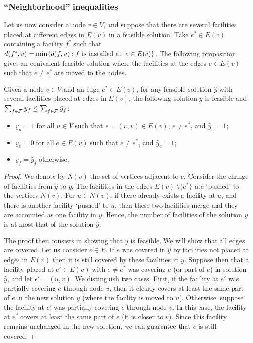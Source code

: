 \subsubsection*{``Neighborhood'' inequalities}
Let us now consider a node $v\in V$, and suppose that there are several facilities placed at different edges in $E(v)$ in a feasible solution. Take $e^*\in E(v)$ containing a facility $f^*$ such that $d(f^*,v)=\min \{d(f,v): f \textup{ is installed at }\:e\in E(v)\}$. The following proposition gives an equivalent feasible solution where the facilities at the edges $e\in E(v)$ such that $e\neq e^*$ are moved to the nodes.
\begin{proposition}\label{lemma:ineq}
Given a node $v \in V$ and an edge $e^* \in E(v)$, for any feasible solution $\hat{y}$ with several facilities placed at edges in $E(v)$, the following solution $y$ is feasible and $\sum_{f \in \mathcal F} y_f \le \sum_{f \in \mathcal F} \hat{y}_f$:
\begin{itemize}
	\item $y_{u}=1$ for all $u\in V$ such that $e=(u,v)\in E(v)$, $e \neq e^*$, and $\hat{y}_e=1$;
	\item $y_{e}=0$ for all $e\in E(v)$ such that $e \neq e^*$, and $\hat{y}_e=1$;
	\item $y_f=\hat{y}_f$ otherwise.
\end{itemize}
\end{proposition}
\begin{proof}
We denote by $N(v)$ the set of vertices adjacent to $v$. Consider the change of facilities from $\hat{y}$ to $y$. The facilities in the edges $E(v) \ \setminus \{e^*\}$ are `pushed' to the vertices $N(v)$. For $u \in N(v)$, if there already exists a facility at $u$, and there is another facility `pushed' to $u$, then these two facilities merge and they are accounted as one facility in  $y$. Hence, the number of facilities of the solution $y$ is at most that of the solution $\hat{y}$.

The proof then consists in showing that $y$ is feasible. We will show that all edges are covered. Let us consider $e\in E$. If $e$ was covered in $\hat{y}$ by facilities not placed at edges in $E(v)$ then it is still covered by these facilities in $y$. Suppose then that a facility placed at $e'\in E(v)$ with $e\neq e^*$ was covering $e$ (or part of $e$) in solution $\hat{y}$, and let $e'=(u,v)$. We distinguish two cases. First, if the facility at $e'$ was partially covering $e$ through node $u$, then it clearly covers at least the same part of $e$ in the new solution $y$ (where the facility is moved to $u$). Otherwise, suppose the facility at $e'$ was partially covering $e$ through node $v$. In this case, the facility at $e^*$ covers at least the same part of $e$ (it is closer to $v$). Since this facility remains unchanged in the new solution, we can guarantee that $e$ is still covered.
\end{proof}
